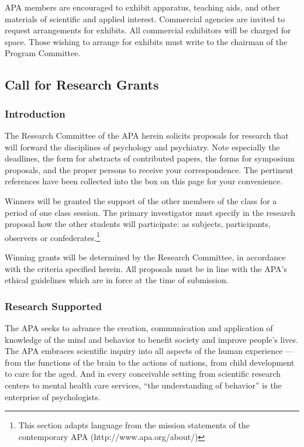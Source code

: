 APA members are encouraged to exhibit apparatus, teaching aids, and other materials of scientific and applied interest. Commercial agencies are invited to request arrangements for exhibits. All commercial exhibitors will be charged for space. Those wishing to arrange for exhibits must write to the chairman of the Program Committee.

\subsection{Call for Research Grants}
\label{callforresearchgrants}

\subsubsection{Introduction}
\label{introduction}

The Research Committee of the APA herein solicits proposals for research that will forward the disciplines of psychology and psychiatry. Note especially the deadlines, the form for abstracts of contributed papers, the forms for symposium proposals, and the proper persons to receive your correspondence. The pertinent references have been collected into the box on this page for your convenience.

Winners will be granted the support of the other members of the class for a period of one class session. The primary investigator must specify in the research proposal how the other students will participate: as subjects, participants, observers or confederates.\footnote{This section adapts language from the mission statements of the contemporary APA (http:\slash \slash www.apa.org\slash about\slash )}

Winning grants will be determined by the Research Committee, in accordance with the criteria specified herein. All proposals must be in line with the APA's ethical guidelines which are in force at the time of submission.

\subsubsection{Research Supported}
\label{researchsupported}

The APA seeks to advance the creation, communication and application of knowledge of the mind and behavior to benefit society and improve people's lives. The APA embraces scientific inquiry into all aspects of the human experience — from the functions of the brain to the actions of nations, from child development to care for the aged. And in every conceivable setting from scientific research centers to mental health care services, ``the understanding of behavior'' is the enterprise of psychologists.

